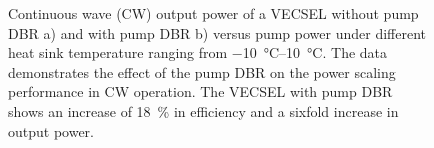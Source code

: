 \begin{figure}[ht]
    \centering
    \hfill
    \caption{Continuous wave (CW) output power of a VECSEL without pump DBR a) and with pump DBR b) versus pump power under different heat sink temperature ranging from \qtyrange{-10}{10}{\celsius}. The data demonstrates the effect of the pump DBR on the power scaling performance in CW operation. The VECSEL with pump DBR shows an increase of \qty{18}{\percent} in efficiency and a sixfold increase in output power.}
    \label{fig:pslope}
\end{figure}




